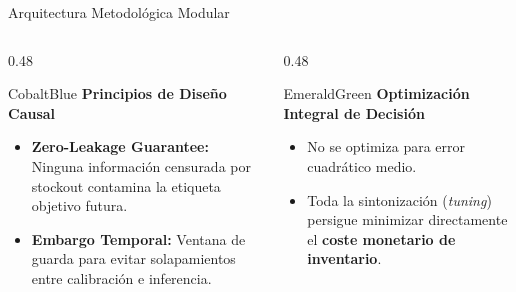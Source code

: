 \documentclass[aspectratio=169, 10pt]{beamer}
\begin{document}
\begin{frame}{Arquitectura Metodológica Modular}
  \vspace{0.4cm}
  \begin{columns}[T]
    \begin{column}{0.48\textwidth}
      \begin{metriccard}{CobaltBlue}
        \textbf{\textcolor{CobaltBlue}{Principios de Diseño Causal}}
        \begin{itemize}\footnotesize
          \item \textbf{Zero-Leakage Guarantee:} Ninguna información censurada por stockout contamina la etiqueta objetivo futura.
          \item \textbf{Embargo Temporal:} Ventana de guarda para evitar solapamientos entre calibración e inferencia.
        \end{itemize}
      \end{metriccard}
    \end{column}
    \begin{column}{0.48\textwidth}
      \begin{metriccard}{EmeraldGreen}
        \textbf{\textcolor{EmeraldGreen}{Optimización Integral de Decisión}}
        \begin{itemize}\footnotesize
          \item No se optimiza para error cuadrático medio.
          \item Toda la sintonización (\textit{tuning}) persigue minimizar directamente el \textbf{coste monetario de inventario}.
        \end{itemize}
      \end{metriccard}
    \end{column}
  \end{columns}
\end{frame}
\end{document}
